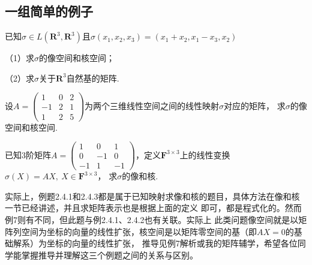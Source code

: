 \subsection{一组简单的例子}
\begin{example}
	已知$\sigma \in L(\mathbf{R}^3,\mathbf{R}^3)$且$\sigma(x_1,x_2,x_3)=(x_1+x_2,x_1-x_3, x_2)$
	
	\textup{（1）}求$\sigma$的像空间和核空间；

	\textup{（2）}求$\sigma$关于$\mathbf{R}^3$自然基的矩阵.
\end{example}

\begin{example}
	设$A=\begin{pmatrix}1 & 0 & 2 \\ -1 & 2 & 1 \\ 1 & 2 & 5\end{pmatrix}$为两个三维线性空间之间的线性映射$\sigma$对应的矩阵，
	求$\sigma$的像空间和核空间.
\end{example}

\begin{example}
	已知$3$阶矩阵$A=\begin{pmatrix}
		1 & 0 & 1 \\ 0 & -1 & 0 \\ -1 & 1 & -1
	\end{pmatrix}$，定义$\mathbf{F}^{3 \times 3}$上的线性变换$\sigma(X)=AX,\ X \in \mathbf{F}^{3 \times 3}$，
	求$\sigma$的像和核.
\end{example}
实际上，例题2.4.1和2.4.3都是属于已知映射求像和核的题目，具体方法在像和核一节已经讲述，并且求矩阵表示也是根据上面的定义
即可，都是程式化的。然而例7则有不同，但此题与例2.4.1、2.4.2也有关联。实际上
此类问题像空间就是以矩阵列空间为坐标的向量的线性扩张，核空间是以矩阵零空间的基（即$AX=0$的基础解系）为坐标的向量的线性扩张，
推导见例7解析或我的矩阵辅学，希望各位同学能掌握推导并理解这三个例题之间的关系与区别。

